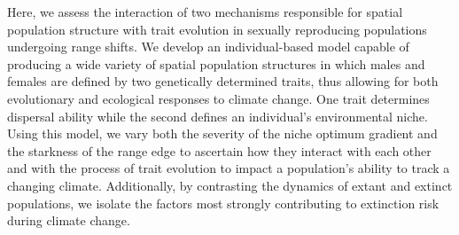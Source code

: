 \documentclass[11pt]{article}
\begin{document}
Here, we assess the interaction of two mechanisms responsible for spatial population structure with trait evolution in sexually reproducing populations undergoing range shifts. We develop an individual-based model capable of producing a wide variety of spatial population structures in which males and females are defined by two genetically determined traits, thus allowing for both evolutionary and ecological responses to climate change. One trait determines dispersal ability while the second defines an individual's environmental niche. Using this model, we vary both the severity of the niche optimum gradient and the starkness of the range edge to ascertain how they interact with each other and with the process of trait evolution to impact a population's ability to track a changing climate. Additionally, by contrasting the dynamics of extant and extinct populations, we isolate the factors most strongly contributing to extinction risk during climate change.
\end{document}
